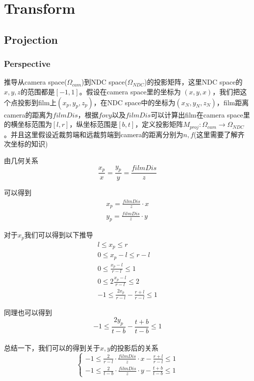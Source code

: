\section{Transform}
\subsection{Projection}
\subsubsection{Perspective}
\par
推导从camera space($\Omega_{cam}$)到NDC space($\Omega_{NDC}$)的投影矩阵，这里NDC space的$x,y,z$的范围都是$[-1,1]$。假设在camera space里的坐标为 $(x,y,x)$，我们把这个点投影到film上$(x_p,y_p,z_p)$，在NDC space中的坐标为$(x_N, y_N,z_N)，$film距离camera的距离为$filmDis$，根据$fovy$以及$filmDis$可以计算出film在camera space里的横坐标范围为$[l,r]$，纵坐标范围是$[b,t]$，定义投影矩阵$M_{proj}: \Omega_{cam}\to \Omega_{NDC}$。并且这里假设近裁剪端和远裁剪端到camera的距离分别为$n,f$(这里需要了解齐次坐标的知识)

由几何关系
\begin{displaymath}
\frac{x_p}{x} = \frac{y_p}{y} = \frac{filmDis}{z}
\end{displaymath}

可以得到
\begin{gather*}
x_p = \frac{filmDis}{z} \cdot x\\
y_p = \frac{filmDis}{z} \cdot y
\end{gather*}

对于$x_p$我们可以得到以下推导
\begin{gather*}
l \leq x_p \leq r\\
0 \leq x_p - l \leq r-l\\
0 \leq \frac{x_p - l}{r - l} \leq 1\\
0 \leq 2\frac{x_p - l}{r - l} \leq 2\\
-1 \leq \frac{2 x_p}{r-l} - \frac{r + l}{r - l} \leq 1
\end{gather*}

同理也可以得到
\begin{displaymath}
-1 \leq \frac{2y_p}{t - b} - \frac{t + b}{t - b} \leq 1
\end{displaymath}
\\

总结一下，我们可以的得到关于$x, y$的投影后的关系
\begin{displaymath}
\left\{
\begin{gathered}
-1 \leq \frac{2}{r - l}\cdot\frac{filmDis}{z}\cdot x - \frac{r + l}{r - l} \leq 1\\
-1 \leq \frac{2}{t - b}\cdot\frac{filmDis}{z}\cdot y - \frac{t + b}{t - b} \leq 1
\end{gathered}
\right.
\end{displaymath}
\\

